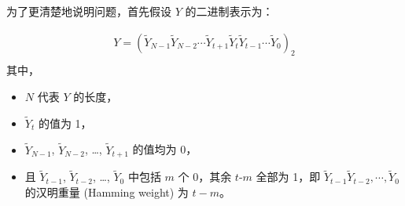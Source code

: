 \documentclass[main\_\_CN.tex]{subfiles}
\begin{document}
为了更清楚地说明问题，首先假设 \begin{math}Y \end{math} 的二进制表示为：

\begin{gather*}
Y = ( \widetilde{Y}_{N-1} \widetilde{Y}_{N-2} \cdots \widetilde{Y}_{t+1} \widetilde{Y}_{t} \widetilde{Y}_{t-1} \cdots \widetilde{Y}_{0} )_{2} \\
\end{gather*}
其中，
\begin{itemize}
    \item \begin{math} N \end{math} 代表 \begin{math}Y \end{math} 的长度，
    \item \begin{math}\widetilde{Y}_{t}\end{math} 的值为 1，
    \item \begin{math}\widetilde{Y}_{N-1}\end{math}, \begin{math}\widetilde{Y}_{N-2}\end{math}, \dots, \begin{math}\widetilde{Y}_{t+1}\end{math} 的值均为 0，
    \item 且 \begin{math}\widetilde{Y}_{t-1}\end{math}, \begin{math}\widetilde{Y}_{t-2}\end{math}, \dots, \begin{math}\widetilde{Y}_{0}\end{math} 中包括 \begin{math}m\end{math} 个 0，其余 \begin{math}t\end{math}-\begin{math}m\end{math} 全部为 1，即 \begin{math}\widetilde{Y}_{t-1} \widetilde{Y}_{t-2}, \cdots, \widetilde{Y}_{0}\end{math} 的汉明重量 (Hamming weight) 为 \begin{math}t -m\end{math}。
\end{itemize}
\end{document}
